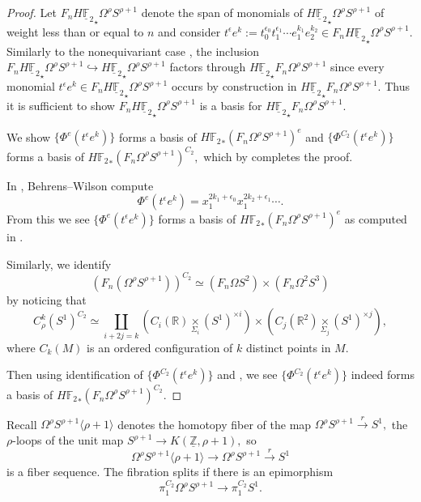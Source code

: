 \documentclass[]{amsart}  %
\theoremstyle{definition}
\numberwithin{equation}{section}
\numberwithin{figure}{section}
\newcommand{\mF}{{\mathbb F}}
\newcommand{\mR}{{\mathbb R}}
\newcommand{\mZ}{{\mathbb Z}}
\newcommand{\umF}{\underline{\mF}}
\newcommand{\umZ}{\underline{\mZ}}
\newcommand{\0}{\langle 0 \rangle}
\begin{document}
\begin{proof}
 Let $F_n H {\umF_2}_\star \Omega^\rho S^{\rho + 1}$ denote the span of monomials of $H {\umF_2}_\star \Omega^\rho S^{\rho + 1}$ of weight less than or equal to $n$ and consider $t^\epsilon e^k := t_0^{\epsilon_0} t_1^{\epsilon_1} \cdots e_1^{k_1} e_2^{k_2} \in F_n H {\umF_2}_\star \Omega^\rho S^{\rho + 1}.$ Similarly to the nonequivariant case \cite[p. 239]{CohenLadaMay76}, the inclusion \\ $F_n H{\umF_2}_\star \Omega^\rho S^{\rho + 1} \hookrightarrow H {\umF_2}_\star \Omega^\rho S^{\rho + 1}$ factors through $H {\umF_2}_\star F_n \Omega^\rho S^{\rho + 1}$ since every monomial $ t^\epsilon e^k \in F_n H {\umF_2}_\star \Omega^\rho S^{\rho + 1}$ occurs by construction in $H {\umF_2}_\star F_n \Omega^\rho S^{\rho + 1}.$ Thus it is sufficient to show $F_n H {\umF_2}_\star \Omega^\rho S^{\rho + 1}$ is a basis for $H {\umF_2}_\star F_n \Omega^\rho S^{\rho + 1}.$ 

 We show $\{\Phi^e (t^\epsilon e^k)\}$ forms a basis of $H {\mF_2}_* (F_n \Omega^\rho S^{\rho + 1})^e$ and $\{\Phi^{C_2} (t^\epsilon e^k)\}$ forms a basis of $H {\mF_2}_* (F_n \Omega^\rho S^{\rho + 1})^{C_2},$ which by \cite[Lemma 2.8]{BW2018} completes the proof. 
 
 In \cite[]{BW2018}, Behrens--Wilson compute 
 \[
 \Phi^e (t^\epsilon e^k) = x_1^{2k_1 + \epsilon_0} x_1^{2k_2 + \epsilon_1} \cdots.
 \]
 From this we see $\{\Phi^e (t^\epsilon e^k)\}$ forms a basis of $H {\mF_2}_* (F_n \Omega^\rho S^{\rho + 1})^e$ as computed in \cite[p. 239]{CohenLadaMay76}.

 Similarly, we identify 
 \[
 (F_n(\Omega^\rho S^{\rho + 1}))^{C_2} \simeq (F_n \Omega S^2) \times (F_n \Omega^2 S^3)
 \]
 by noticing that  
 \[
 C_\rho^k (S^1)^{C_2} \simeq \underset{i + 2j = k}{\coprod} \left(C_i(\mR) \underset{\Sigma_i}{\times}{(S^1)^{\times i}}\right) \times \left(C_j(\mR^2) \underset{\Sigma_j}{\times} (S^1)^{\times j} \right),
 \]
where $C_k(M)$ is an ordered configuration of $k$ distinct points in $M.$
 
Then using \cite[]{BW2018} identification of $\{\Phi^{C_2} (t^\epsilon e^k)\}$ and \cite[p. 239]{CohenLadaMay76}, we see  $\{\Phi^{C_2} (t^\epsilon e^k)\}$ indeed forms a basis of $H {\mF_2}_* (F_n \Omega^\rho S^{\rho + 1})^{C_2}.$
\end{proof}
	
Recall $\Omega^\rho S^{\rho + 1} \langle \rho + 1 \rangle$ denotes the homotopy fiber of the map $\Omega^\rho S^{\rho + 1} \xrightarrow{r} S^1 ,$  the $\rho$-loops of the unit map $S^{\rho + 1} \to K( \umZ, \rho + 1),$ so
$$\Omega^\rho S^{\rho + 1} \langle \rho + 1 \rangle \to \Omega^\rho S^{\rho + 1} \xrightarrow{r} S^1 $$
 is a fiber sequence.
The fibration splits if there is an epimorphism
$$\pi_{1}^{C_2} \Omega^\rho S^{\rho + 1} \to \pi_1^{C_2} S^1.$$
\end{document}
